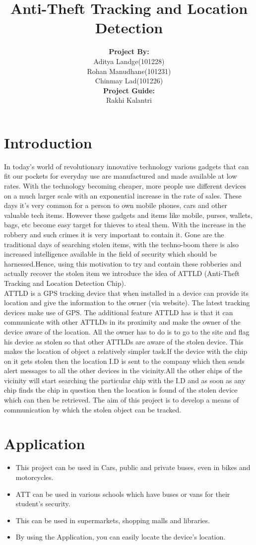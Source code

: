 \documentclass[a4paper,10pt]{report}
\title{\textbf{Anti-Theft Tracking and Location Detection}}
\author{\textbf{Project By:}\\Aditya Landge(101228)\\Rohan Manudhane(101231)\\Chinmay Lad(101226)\\[0.3in]\textbf{Project Guide:}\\Rakhi Kalantri}
\begin{document}
\maketitle
\tableofcontents

\chapter{Introduction}
In today’s world of revolutionary innovative technology various gadgets that can fit our pockets for everyday use are manufactured and made available at low rates. With the technology becoming cheaper, more people use different devices on a much larger scale with an exponential increase in the rate of sales. These days it’s very common for a person to own mobile phones, cars and other valuable tech items. However these gadgets and items like mobile, purses, wallets, bags, etc become easy target for thieves to steal them. With the increase in the robbery and such crimes it is very important to contain it. Gone are the traditional days of searching stolen items, with the techno-boom there is also increased intelligence available in the field of security which should be harnessed.Hence, using this motivation to try and contain these robberies and actually recover the stolen item we introduce the idea of ATTLD (Anti-Theft Tracking and Location Detection Chip).\\[0.15in]
ATTLD is a GPS tracking device that when installed in a device can provide its location and give the information to the owner (via website). The latest tracking devices make use of GPS. The additional feature ATTLD has is that it can communicate with other ATTLDs in its proximity and make the owner of the device aware of the location. All the owner has to do is to go to the site and flag his device as stolen so that other ATTLDs are aware of the stolen device. This makes the location of object a relatively simpler task.If the device with the chip on it gets stolen then the location I.D is sent to the company which then sends alert messages to all the other devices in the vicinity.All the other chips of the vicinity will start searching the particular chip with the I.D and as soon as any chip finds the chip in question then the location is found of the stolen device which can then be retrieved.
The aim of this project is to develop a means of communication by which the stolen object can be tracked.

\chapter{Application}
\begin{itemize}
 \item This project can be used in Cars, public and private buses, even in bikes and motorcycles.
 \item ATT can be used in various schools which have buses or vans for their student’s security.
 \item This can be used in supermarkets, shopping malls and libraries.
 \item By using the Application, you can easily locate the device's location.
\end{itemize}
\end{document}
